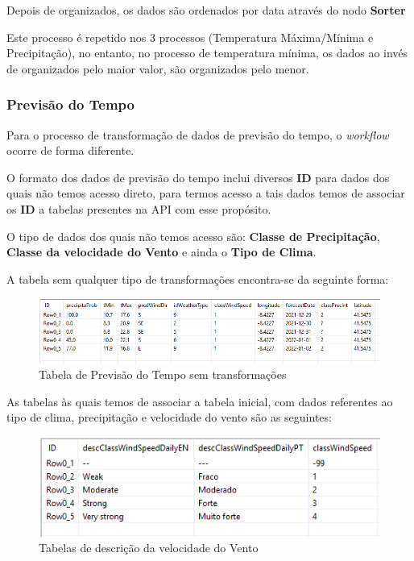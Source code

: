 Depois de organizados, os dados são ordenados por data através do nodo \textbf{Sorter}

Este processo é repetido nos 3 processos (Temperatura Máxima/Mínima e Precipitação), no entanto, no processo de temperatura mínima, os dados ao invés de organizados pelo maior valor, são organizados pelo menor.

\subsubsection*{Previsão do Tempo}

Para o processo de transformação de dados de previsão do tempo, o \textit{workflow} ocorre de forma diferente.

O formato dos dados de previsão do tempo inclui diversos \textbf{ID} para dados dos quais não temos acesso direto, para termos acesso a tais dados temos de associar os \textbf{ID} a tabelas presentes na API com esse propósito.

O tipo de dados dos quais não temos acesso são: \textbf{Classe de Precipitação}, \textbf{Classe da velocidade do Vento} e ainda o \textbf{Tipo de Clima}.

A tabela sem qualquer tipo de transformações encontra-se da seguinte forma:

\begin{figure}[H]
    \centering
    \includegraphics[scale=0.65]{imagens/prevNotransTable.png}
    \caption{Tabela de Previsão do Tempo sem transformações}
\end{figure}

As tabelas às quais temos de associar a tabela inicial, com dados referentes ao tipo de clima, precipitação e velocidade do vento são as seguintes:


\begin{figure}[H]
    \centering
    \includegraphics[]{imagens/WindType.png}
    \caption{Tabelas de descrição da velocidade do Vento}
\end{figure}

